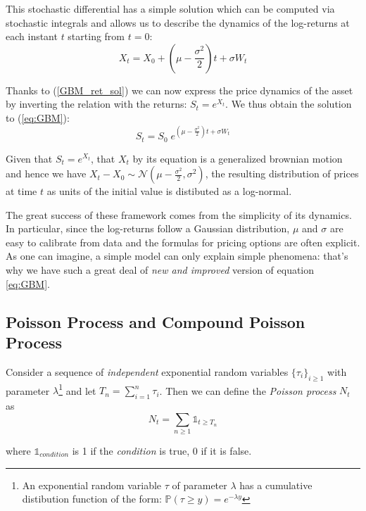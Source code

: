 This stochastic differential has a simple solution which can be computed via stochastic integrals and allows us to describe the dynamics of the log-returns at each instant $t$ starting from $t=0$:
\begin{equation}
	\label{GBM_ret_sol}
	X_t = X_0 + (\mu - 	\frac{\sigma^2}{2}) t + \sigma W_t
\end{equation}

Thanks to (\ref{GBM_ret_sol}) we can now express the price dynamics of the asset by inverting the relation with the returns: $S_t = e^{X_t}$. 
We thus obtain the solution to (\ref{eq:GBM}):
\begin{equation}
	S_t = S_0 \;e^{(\mu - 	\frac{\sigma^2}{2}) t + \sigma W_t}
\end{equation}

Given that $S_t = e^{X_t}$, that $X_t$ by its equation is a generalized brownian motion and hence we have $X_t - X_0 \sim \mathcal{N}(\mu - 	\frac{\sigma^2}{2}, \sigma^2)$, the resulting distribution of prices at time $t$ as units of the initial value is distibuted as a log-normal.

The great success of these framework comes from the simplicity of its dynamics. In particular, since the log-returns follow a Gaussian distribution, $\mu$ and $\sigma$ are easy to calibrate from data and the formulas for pricing options  are often explicit.
As one can imagine, a simple model can only explain simple phenomena: that's why we have such a great deal of \textit{new and improved} version of equation \ref{eq:GBM}.

\subsection{Poisson Process and Compound Poisson Process}
Consider a sequence of \textit{independent} exponential random variables  $\{\tau_i\}_{i\geq1}$ with parameter $\lambda$\footnote{An exponential random variable $\tau$ of parameter $\lambda$ has a cumulative distibution function of the form: $\mathbb{P}(\tau \geq y) = e^{-\lambda y}$} and let $T_n = \sum_{i=1}^{n}\tau_i$. Then we can define the \textit{Poisson process} $N_t$ as
\begin{equation}
 	N_t = \sum_{n\geq 1} \mathds{1}_{t \geq T_n}
\end{equation}

where $\mathds{1}_{condition}$ is 1 if the \textit{condition} is true, 0 if it is false.

